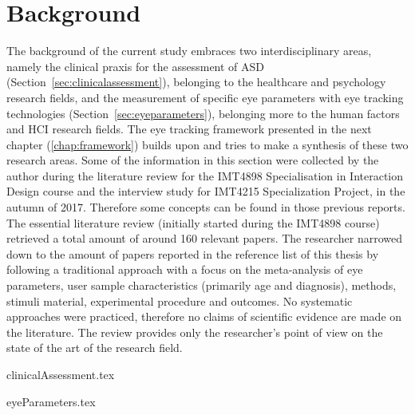 \chapter{Background}
\label{chap:background}

The background of the current study embraces two interdisciplinary areas, namely the clinical praxis for the assessment of ASD (Section~\ref{sec:clinicalassessment}), belonging to the healthcare and psychology research fields, and the measurement of specific eye parameters with eye tracking technologies (Section~\ref{sec:eyeparameters}), belonging more to the human factors and HCI research fields. The eye tracking framework presented in the next chapter (\ref{chap:framework}) builds upon and tries to make a synthesis of these two research areas.
Some of the information in this section were collected by the author during the literature review for the IMT4898 Specialisation in Interaction Design course and the interview study for IMT4215 Specialization Project, in the autumn of 2017. Therefore some concepts can be found in those previous reports.
The essential literature review (initially started during the IMT4898 course) retrieved a total amount of around 160 relevant papers. The researcher narrowed down to the amount of papers reported in the reference list of this thesis by following a traditional approach \citep[pp. 74-76]{jesson2011literaturereview} with a focus on the meta-analysis of eye parameters, user sample characteristics (primarily age and diagnosis), methods, stimuli material, experimental procedure and outcomes. No systematic approaches were practiced, therefore no claims of scientific evidence are made on the literature. The review provides only the researcher's point of view on the state of the art of the research field.


{clinicalAssessment.tex}

{eyeParameters.tex}




